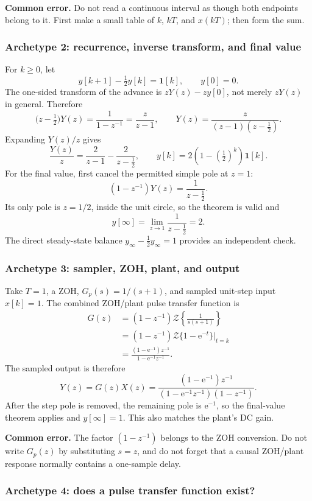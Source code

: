 \documentclass[11pt]{article}
\newcommand{\Z}{\mathcal{Z}}
\newcommand{\e}{\mathrm{e}}
\newcommand{\unitstep}{\mathbf{1}}
\newcommand{\commonerror}[1]{\par\smallskip\noindent\colorbox{red!8}{\parbox{\dimexpr\linewidth-2\fboxsep\relax}{\textbf{Common error.} #1}}\par\smallskip}
\begin{document}
\commonerror{Do not read a continuous interval as though both endpoints belong to it.  First make a small table of $k$, $kT$, and $x(kT)$; then form the sum.}

\subsubsection*{Archetype 2: recurrence, inverse transform, and final value}

For $k\ge0$, let
\[
y[k+1]-\tfrac12y[k]=\unitstep[k],\qquad y[0]=0.
\]
The one-sided transform of the advance is $zY(z)-zy[0]$, not merely $zY(z)$ in general.  Therefore
\[
\bigl(z-\tfrac12\bigr)Y(z)=\frac{1}{1-z^{-1}}=\frac{z}{z-1},
\qquad
Y(z)=\frac{z}{(z-1)(z-\tfrac12)}.
\]
Expanding $Y(z)/z$ gives
\[
\frac{Y(z)}{z}=\frac{2}{z-1}-\frac{2}{z-\tfrac12},
\qquad
y[k]=2\left(1-\left(\tfrac12\right)^k\right)\unitstep[k].
\]
For the final value, first cancel the permitted simple pole at $z=1$:
\[
(1-z^{-1})Y(z)=\frac{1}{z-\tfrac12}.
\]
Its only pole is $z=1/2$, inside the unit circle, so the theorem is valid and
\[
y[\infty]=\lim_{z\to1}\frac{1}{z-\tfrac12}=2.
\]
The direct steady-state balance $y_\infty-\tfrac12y_\infty=1$ provides an independent check.

\subsubsection*{Archetype 3: sampler, ZOH, plant, and output}

Take $T=1$, a ZOH, $G_p(s)=1/(s+1)$, and sampled unit-step input $x[k]=1$.  The combined ZOH/plant pulse transfer function is
\begin{align*}
G(z)
&=(1-z^{-1})\Z\!\left\{\frac{1}{s(s+1)}\right\}\\
&=(1-z^{-1})\Z\{1-\e^{-t}\}\big|_{t=k}\\
&=\frac{(1-\e^{-1})z^{-1}}{1-\e^{-1}z^{-1}}.
\end{align*}
The sampled output is therefore
\[
Y(z)=G(z)X(z)
=\frac{(1-\e^{-1})z^{-1}}
{(1-\e^{-1}z^{-1})(1-z^{-1})}.
\]
After the step pole is removed, the remaining pole is $\e^{-1}$, so the final-value theorem applies and $y[\infty]=1$.  This also matches the plant's DC gain.

\commonerror{The factor $(1-z^{-1})$ belongs to the ZOH conversion.  Do not write $G_p(z)$ by substituting $s=z$, and do not forget that a causal ZOH/plant response normally contains a one-sample delay.}

\subsubsection*{Archetype 4: does a pulse transfer function exist?}
\end{document}
